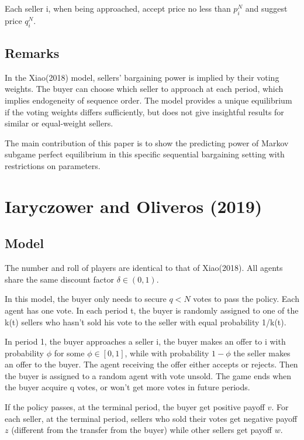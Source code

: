 \documentclass[ProjectGAZ]{subfiles}
\begin{document}
Each seller i, when being approached, accept price no less than $p_i^N$ and suggest price $q_i^N$.

\subsection{Remarks}\label{subsec:Xiao-Remarks}

In the Xiao(2018) model, sellers' bargaining power is implied by their voting weights. The buyer can choose which seller to approach at each period, which implies endogeneity of sequence order. The model provides a unique equilibrium if the voting weights differs sufficiently, but does not give insightful results for similar or equal-weight sellers.

The main contribution of this paper is to show the predicting power of Markov subgame perfect equilibrium in this specific sequential bargaining setting with restrictions on parameters.

\section{Iaryczower and Oliveros (2019)}

\subsection{Model}\label{subsec:InO-Model}

The number and roll of players are identical to that of Xiao(2018). All agents share the same discount factor $\delta \in (0, 1)$.

In this model, the buyer only needs to secure $q < N$ votes to pass the policy. Each agent has one vote. In each period t, the buyer is randomly assigned to one of the k(t) sellers who hasn't sold his vote to the seller with equal probability 1/k(t).  

In period 1, the buyer approaches a seller i, the buyer makes an offer to i with probability $\phi$ for some $\phi \in [0,1]$, while with probability $1 - \phi$ the seller makes an offer to the buyer. The agent receiving the offer either accepts or rejects. Then the buyer is assigned to a random agent with vote unsold. The game ends when the buyer acquire q votes, or won't get more votes in future periods.

If the policy passes, at the terminal period, the buyer get positive payoff $v$. For each seller, at the terminal period, sellers who sold their votes get negative payoff $z$ (different from the transfer from the buyer) while other sellers get payoff $w$.
\end{document}
